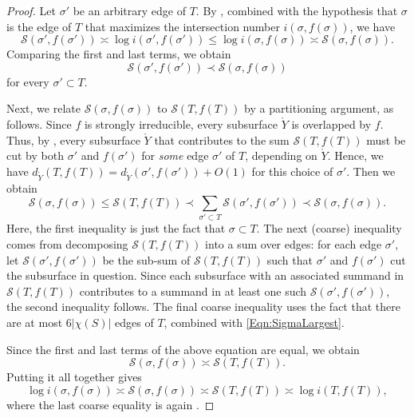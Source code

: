 \documentclass[11pt,letterpaper]{amsart}
\newcommand{\mc}{\mathcal}
\newcommand{\mr}{\mathring}
\numberwithin{equation}{section}
\theoremstyle{definition}
\begin{document}
\begin{proof}
Let $\sigma'$ be an arbitrary edge of $T$. By , combined with the hypothesis that $\sigma$ is the edge of $T$ that maximizes the intersection number $i(\sigma, f(\sigma))$, we have
\[
\mc S(\sigma', f(\sigma'))  \asymp  \log i(\sigma', f(\sigma')) \leq 
 \log i(\sigma, f(\sigma)) \asymp  \mc S(\sigma, f(\sigma)).
\]
Comparing the first and last terms, we obtain
\begin{equation}\label{Eqn:SigmaLargest}
\mc S(\sigma', f(\sigma')) \prec \mc S(\sigma, f(\sigma))
\end{equation}
for every $\sigma' \subset T$. 


Next, we relate $\mc S (\sigma, f(\sigma))$ to $\mc S(T, f(T))$ by a partitioning argument, as follows. 
Since $f$ is strongly irreducible, every subsurface $\mr Y$ is overlapped by $f$.
Thus, by  , 
every subsurface $\mr Y$ that contributes to the sum $\mc S(T, f(T))$ must be cut by both $\sigma'$ and $f(\sigma')$ for \emph{some} edge $\sigma'$ of $T$, depending on $\mr Y$. Hence, we have $d_{\mr Y}(T, f(T)) = d_{\mr Y}(\sigma', f(\sigma')) + O(1)$ for 
this choice of $\sigma'$.
Then we obtain
\[
\mc S(\sigma, f(\sigma)) \leq \mc S(T, f(T)) \prec \sum_{\sigma' \subset T} \mc S(\sigma', f(\sigma'))
\prec \mc S(\sigma, f(\sigma)).
\]
Here, the first inequality is just the fact that $\sigma \subset T$. The next (coarse) inequality comes from decomposing $\mc S(T, f(T))$ into a sum over edges: for each edge $\sigma'$, let $\mc S(\sigma', f(\sigma'))$ be the sub-sum of $\mc S(T, f(T))$ such that $\sigma'$ and $f(\sigma')$ cut the subsurface in question. Since each subsurface with an associated summand in $\mc S(T, f(T))$ contributes to a summand in at least one such $\mc S(\sigma', f(\sigma'))$, the second inequality follows. The final coarse inequality uses the fact that there are at most $6|\chi(S)|$ edges of $T$, 
combined with \eqref{Eqn:SigmaLargest}.

Since the first and last terms of the above equation are equal, we obtain
\[
\mc S(\sigma, f(\sigma)) \asymp \mc S(T, f(T)).
\]
Putting it all together gives
\[
\log i(\sigma, f(\sigma)) \asymp \mc S(\sigma, f(\sigma)) \asymp \mc S(T, f(T)) \asymp \log i(T, f(T)), 
\]
where the last coarse equality is again .
\end{proof}
\end{document}

